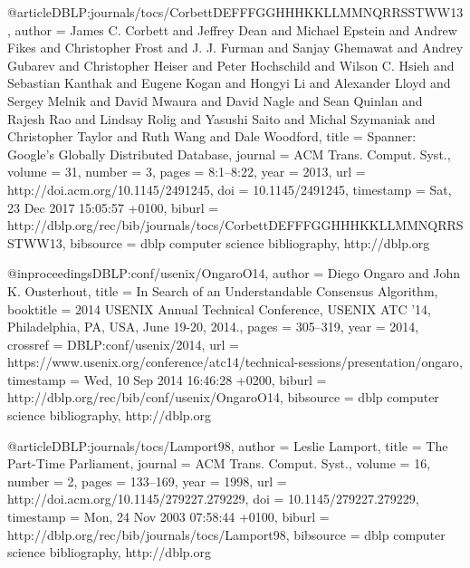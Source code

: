 @article{DBLP:journals/tocs/CorbettDEFFFGGHHHKKLLMMNQRRSSTWW13,
  author    = {James C. Corbett and
               Jeffrey Dean and
               Michael Epstein and
               Andrew Fikes and
               Christopher Frost and
               J. J. Furman and
               Sanjay Ghemawat and
               Andrey Gubarev and
               Christopher Heiser and
               Peter Hochschild and
               Wilson C. Hsieh and
               Sebastian Kanthak and
               Eugene Kogan and
               Hongyi Li and
               Alexander Lloyd and
               Sergey Melnik and
               David Mwaura and
               David Nagle and
               Sean Quinlan and
               Rajesh Rao and
               Lindsay Rolig and
               Yasushi Saito and
               Michal Szymaniak and
               Christopher Taylor and
               Ruth Wang and
               Dale Woodford},
  title     = {Spanner: Google's Globally Distributed Database},
  journal   = {{ACM} Trans. Comput. Syst.},
  volume    = {31},
  number    = {3},
  pages     = {8:1--8:22},
  year      = {2013},
  url       = {http://doi.acm.org/10.1145/2491245},
  doi       = {10.1145/2491245},
  timestamp = {Sat, 23 Dec 2017 15:05:57 +0100},
  biburl    = {http://dblp.org/rec/bib/journals/tocs/CorbettDEFFFGGHHHKKLLMMNQRRSSTWW13},
  bibsource = {dblp computer science bibliography, http://dblp.org}
}

@inproceedings{DBLP:conf/usenix/OngaroO14,
  author    = {Diego Ongaro and
               John K. Ousterhout},
  title     = {In Search of an Understandable Consensus Algorithm},
  booktitle = {2014 {USENIX} Annual Technical Conference, {USENIX} {ATC} '14, Philadelphia,
               PA, USA, June 19-20, 2014.},
  pages     = {305--319},
  year      = {2014},
  crossref  = {DBLP:conf/usenix/2014},
  url       = {https://www.usenix.org/conference/atc14/technical-sessions/presentation/ongaro},
  timestamp = {Wed, 10 Sep 2014 16:46:28 +0200},
  biburl    = {http://dblp.org/rec/bib/conf/usenix/OngaroO14},
  bibsource = {dblp computer science bibliography, http://dblp.org}
}

@article{DBLP:journals/tocs/Lamport98,
  author    = {Leslie Lamport},
  title     = {The Part-Time Parliament},
  journal   = {{ACM} Trans. Comput. Syst.},
  volume    = {16},
  number    = {2},
  pages     = {133--169},
  year      = {1998},
  url       = {http://doi.acm.org/10.1145/279227.279229},
  doi       = {10.1145/279227.279229},
  timestamp = {Mon, 24 Nov 2003 07:58:44 +0100},
  biburl    = {http://dblp.org/rec/bib/journals/tocs/Lamport98},
  bibsource = {dblp computer science bibliography, http://dblp.org}
}
